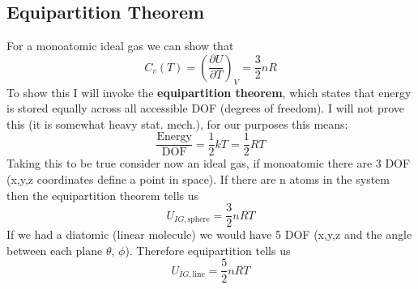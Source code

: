 \documentclass{article}
\begin{document}
\subsection*{Equipartition Theorem}
For a monoatomic ideal gas we can show that
\begin{equation}
C_v(T) = \left(\frac{\partial U}{\partial T}\right)_V = \frac{3}{2}nR
\end{equation}
To show this I will invoke the \textbf{equipartition theorem}, which states that energy is stored equally across all accessible DOF (degrees of freedom). 
I will not prove this (it is somewhat heavy stat. mech.), for our purposes this means:
\begin{equation}
\frac{\text{Energy}}{\text{DOF}} = \frac{1}{2}kT = \frac{1}{2}RT
\end{equation}
Taking this to be true consider now an ideal gas, if monoatomic there are 3 DOF (x,y,z coordinates define a point in space). 
If there are n atoms in the system then the equipartition theorem tells us  
\begin{equation}
U_{IG,\text{sphere}} = \frac{3}{2}nRT
\end{equation}
If we had a diatomic (linear molecule) we would have 5 DOF (x,y,z and the angle between each plane $\theta$, $\phi$). 
Therefore equipartition tells us
\begin{equation}
U_{IG,\text{line}} = \frac{5}{2}nRT
\end{equation}
\end{document}
